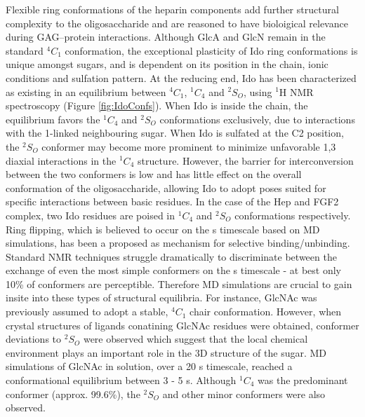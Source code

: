 \documentclass[journal=jctcce,manuscript=article]{achemso}
\begin{document}
{Flexible ring conformations of the heparin components add further structural complexity to the oligosaccharide and are reasoned to have bioloigical relevance during \ac{GAG}--protein interactions.\cite{Sattelle2013DoesHeparanome} 
Although \ac{GlcA} and \ac{GlcN} remain in the standard $^{4}C_{1}$ conformation, the exceptional plasticity of \ac{Ido} ring conformations is unique amongst sugars, and is dependent on its position in the chain, ionic conditions and sulfation pattern.\cite{Capila2002Heparin-proteinInteractions., vanBoeckel1987ConformationalAcid}
At the reducing end, \ac{Ido} has been characterized as existing in an equilibrium between $^{4}C_{1}$, $^{1}C_{4}$ and $^{2}S_{O}$, using $^{1}$H NMR spectroscopy (Figure \ref{fig:IdoConfs}).\cite{Ferro1986EvidenceStudies, vanBoeckel1987ConformationalAcid} 
When \ac{Ido} is inside the chain, the equilibrium favors the $^{1}C_{4}$ and $^{2}S_{O}$ conformations exclusively, due to interactions with the 1-linked neighbouring sugar.\cite{vanBoeckel1987ConformationalAcid} 
When \ac{Ido} is sulfated at the C2 position, the $^{2}S_{O}$ conformer may become more prominent to minimize unfavorable 1,3 diaxial interactions in the $^{1}C_{4}$ structure.\cite{Hsieh2016UncoveringSulphateb} However, the barrier for interconversion between the two conformers is low and has little effect on the overall conformation of the oligosaccharide, allowing \ac{Ido} to adopt poses suited for specific interactions between basic residues. \cite{Capila2002Heparin-proteinInteractions.} In the case of the \ac{Hep} and \ac{FGF2} complex, two \ac{Ido} residues are poised in $^{1}C_{4}$ and $^{2}S_{O}$ conformations respectively.\cite{Faham1996HeparinFactor} Ring flipping, which is believed to occur on the \textmu s timescale based on \ac{MD} simulations, has been a proposed as mechanism for selective binding/unbinding. \cite{Sattelle2012DependenceIdopyranosides} Standard NMR techniques struggle dramatically to discriminate between the exchange of even the most simple conformers on the \textmu s timescale - at best only 10\% of conformers are perceptible.\cite{Sattelle2011IsChair} Therefore \ac{MD} simulations are crucial to gain insite into these types of structural equilibria.\cite{Woods2018PredictingComplexes} 
For instance, \ac{GlcNAc} was previously assumed to adopt a stable, $^{4}C_{1}$ chair conformation.\cite{Sattelle2011IsChair} 
However, when crystal structures of ligands conatining GlcNAc residues were obtained, conformer deviations to $^{2}S_{O}$ were observed which suggest that the local chemical environment plays an important role in the 3D structure of the sugar. 
\ac{MD} simulations of GlcNAc in solution, over a 20 \textmu s timescale, reached a conformational equilibrium between 3 - 5 \textmu s. 
Although  $^{1}C_{4}$ was the predominant conformer (approx. 99.6\%), the $^{2}S_{O}$ and other minor conformers were also observed.





}
\end{document}
